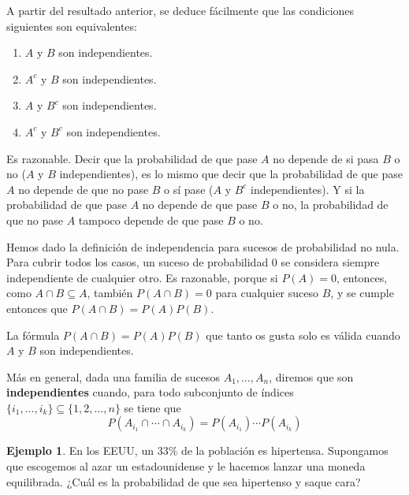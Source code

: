 \documentclass[
]{book}
\providecommand{\tightlist}{%
  \setlength{\itemsep}{0pt}\setlength{\parskip}{0pt}}
\theoremstyle{definition}
\theoremstyle{definition}
\newtheorem{example}{Ejemplo}[chapter]
\theoremstyle{definition}
\theoremstyle{definition}
\theoremstyle{remark}
\begin{document}
A partir del resultado anterior, se deduce fácilmente que las condiciones siguientes son equivalentes:

\begin{enumerate}
\def\labelenumi{\arabic{enumi}.}
\tightlist
\item
  \(A\) y \(B\) son independientes.
\item
  \(A^c\) y \(B\) son independientes.
\item
  \(A\) y \(B^c\) son independientes.
\item
  \(A^c\) y \(B^c\) son independientes.
\end{enumerate}

Es razonable. Decir que la probabilidad de que pase \(A\) no depende de si pasa \(B\) o no (\(A\) y \(B\) independientes), es lo mismo que decir que la probabilidad de que pase \(A\) no depende de que no pase \(B\) o sí pase (\(A\) y \(B^c\) independientes). Y si la probabilidad de que pase \(A\) no depende de que pase \(B\) o no, la probabilidad de que no pase \(A\) tampoco depende de que pase \(B\) o no.

\begin{rmdnote}
Hemos dado la definición de independencia para sucesos de probabilidad no nula. Para cubrir todos los casos, un suceso de probabilidad 0 se considera siempre independiente de cualquier otro. Es razonable, porque si \(P(A)=0\), entonces, como \(A\cap B\subseteq A\), también \(P(A\cap B)=0\) para cualquier suceso \(B\), y se cumple entonces que \(P(A\cap B)=P(A)P(B)\).
\end{rmdnote}

\begin{rmdimportant}
La fórmula \(P(A\cap B)=P(A)P(B)\) que tanto os gusta solo es válida cuando \(A\) y \(B\) son independientes.
\end{rmdimportant}

Más en general, dada una familia de sucesos \(A_1,\ldots,A_n\), diremos que son \textbf{independientes} cuando, para todo subconjunto de índices \(\{i_1,\ldots,i_k\}\subseteq \{1,2,\ldots,n\}\) se tiene que
\[
P(A_{i_1}\cap\cdots \cap A_{i_k})=P(A_{i_1})\cdots P(A_{i_k})
\]

\begin{example}
\protect\hypertarget{exm:unnamed-chunk-127}{}\label{exm:unnamed-chunk-127}En los EEUU, un 33\% de la población es hipertensa. Supongamos que escogemos al azar un estadounidense y le hacemos lanzar una moneda equilibrada. ¿Cuál es la probabilidad de que sea hipertenso y saque cara?
\end{example}
\end{document}
